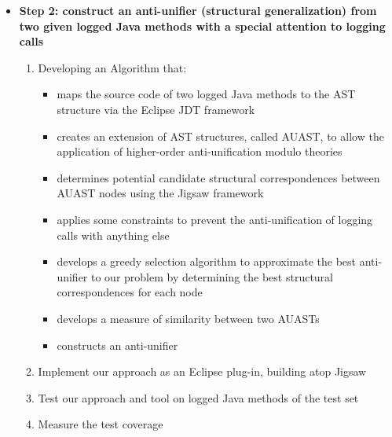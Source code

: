 \documentclass{article}
\newcommand{\cmark}{\ding{51}}%
\newcommand{\pmark}{\ding{59}}%
\newcommand{\bld}{\textbf}
\newcommand{\tsc}{\textsc}
\begin{document}
\begin{itemize} [leftmargin=.1in]
\begin{itemize} [leftmargin=.1in]
 
\item \bld{Step 2: construct an anti-unifier (structural generalization) from two given logged Java methods with a special  attention to logging calls} \cmark
\begin{enumerate}
\item Developing an Algorithm that:
\begin{itemize} [leftmargin=.1in]
\item maps the source code of two logged Java methods to the AST structure via the Eclipse JDT framework \cmark
\item creates an extension of AST structures, called AUAST, to allow the application of higher-order anti-unification modulo theories \cmark
\item determines potential candidate structural correspondences between AUAST nodes using the Jigsaw framework \cmark
\item applies some constraints to prevent the anti-unification of logging calls with anything else \cmark
\item develops a greedy selection algorithm to approximate the best anti-unifier to our problem by determining the best structural correspondences for each node %

\item develops a measure of similarity between two AUASTs \cmark
\item constructs an anti-unifier \cmark
\end{itemize}
\item Implement our approach as an Eclipse plug-in, building atop Jigsaw \cmark
\item Test our approach and tool on logged Java methods of the test set \cmark
\item Measure the test coverage \pmark {}
\end{enumerate}


\end{itemize}
\end{itemize}
\end{document}
